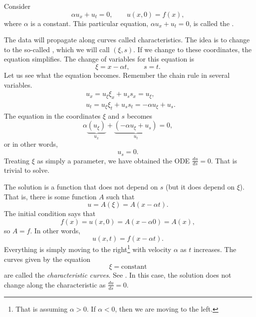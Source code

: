 \begin{example}
Consider
\begin{equation*}
\alpha u_x + u_t = 0, \qquad u(x,0) = f(x) ,
\end{equation*}
where $\alpha$ is a constant.
This particular equation, $\alpha u_x + u_t = 0$, is
called the \emph{}.

The data will propagate along curves called characteristics.  The
idea is to change to the
so-called \emph{}, which we will call
$(\xi,s)$.
If we change to these coordinates, the equation simplifies.  The change of variables for this
equation is
\begin{equation*}
\xi = x - \alpha t ,  \qquad s = t .
\end{equation*}
Let us see what the equation becomes. Remember the chain rule in several
variables.
\begin{align*}
& u_x = u_\xi \xi_x + u_s s_x = u_\xi , \\
& u_t = u_\xi \xi_t + u_s s_t = - \alpha u_\xi + u_s .
\end{align*}
The equation in the coordinates $\xi$ and $s$ becomes
\begin{equation*}
\alpha
\underbrace{(u_\xi)}_{u_x}
+
\underbrace{(- \alpha u_\xi + u_s)}_{u_t}
= 0 ,
\end{equation*}
or in other words,
\begin{equation*}
u_s = 0 .
\end{equation*}
Treating $\xi$ as simply a parameter, we have
obtained the ODE $\frac{d u}{d s} = 0$.
That is trivial to solve.

The solution is a function that does
not depend on $s$ (but it does depend on $\xi$).
That is, there is some function $A$ such that
\begin{equation*}
u = A(\xi) = A(x - \alpha t) .
\end{equation*}
The initial condition says that
\begin{equation*}
f(x) = u(x,0) = A(x - \alpha 0) = A(x) ,
\end{equation*}
so $A=f$.  In other words,
\begin{equation*}
u(x,t) = f(x-\alpha t) .
\end{equation*}
Everything is simply moving to the
right\footnote{That is assuming $\alpha > 0$.
If $\alpha < 0$, then we are moving to the left.}
with velocity $\alpha$ as $t$ increases.
The curves given by the equation
\begin{equation*}
\xi = \text{constant}
\end{equation*}
are called the \emph{characteristic curves}.
See .
In this case, the solution does not change
along the characteristic as $\frac{du}{ds} = 0$.


\end{example}
